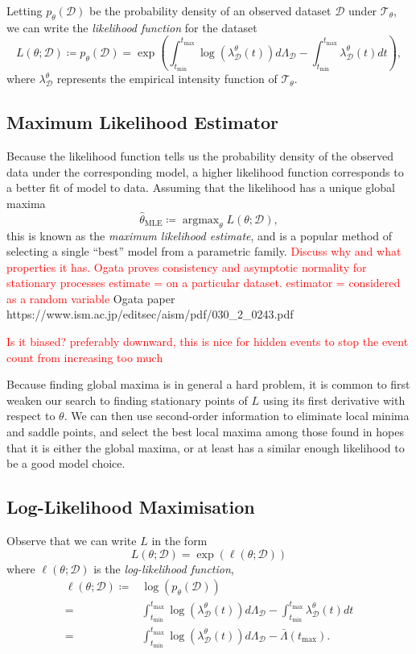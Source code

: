 \documentclass[honours,12pt]{unswthesis}
\DeclareMathOperator*{\argmax}{argmax}
\numberwithin{equation}{section}
\begin{document}
Letting $p_\theta(\mathcal{D})$ be the probability density of an observed dataset $\mathcal{D}$ under $\mathcal{T}_\theta$, we can write the \textit{likelihood function} for the dataset
$$L(\theta ; \mathcal{D}) \coloneq p_\theta(\mathcal{D}) = \exp\left(\int_{t_\mathrm{min}}^{t_\mathrm{max}}\log(\lambda_\mathcal{D}^\theta(t))d\Lambda_\mathcal{D}-\int_{t_\mathrm{min}}^{t_\mathrm{max}}\lambda_\mathcal{D}^\theta(t) dt\right),$$
where $\lambda_\mathcal{D}^\theta$ represents the empirical intensity function of $\mathcal{T}_\theta$.

\subsection{Maximum Likelihood Estimator}
Because the likelihood function tells us the probability density of the observed data under the corresponding model, a higher likelihood function corresponds to a better fit of model to data. Assuming that the likelihood has a unique global maxima
$$\hat\theta_\mathrm{MLE} \coloneq \argmax_\theta L(\theta;\mathcal{D}),$$
this is known as the \textit{maximum likelihood estimate}, and is a popular method of selecting a single ``best'' model from a parametric family.
\textcolor{red}{Discuss why and what properties it has. Ogata proves consistency and asymptotic normality for stationary processes}
\textcolor{red}{estimate = on a particular dataset. estimator = considered as a random variable}
Ogata paper https://www.ism.ac.jp/editsec/aism/pdf/030_2_0243.pdf 

\textcolor{red}{Is it biased? preferably downward, this is nice for hidden events to stop the event count from increasing too much}

Because finding global maxima is in general a hard problem, it is common to first weaken our search to finding stationary points of $L$ using its first derivative with respect to $\theta$. We can then use second-order information to eliminate local minima and saddle points, and select the best local maxima among those found in hopes that it is either the global maxima, or at least has a similar enough likelihood to be a good model choice.

\subsection{Log-Likelihood Maximisation}

Observe that we can write $L$ in the form
$$L(\theta;\mathcal{D}) = \exp(\ell(\theta;\mathcal{D}))$$
where $\ell(\theta;\mathcal{D})$ is the \textit{log-likelihood function},
\begin{equation*}
	\begin{align}
		\ell(\theta ; \mathcal{D})
		\coloneq &\log(p_\theta(\mathcal{D}))\\
		= & \int_{t_\mathrm{min}}^{t_\mathrm{max}}\log(\lambda_\mathcal{D}^\theta(t))d\Lambda_\mathcal{D}-\int_{t_\mathrm{min}}^{t_\mathrm{max}}\lambda_\mathcal{D}^\theta(t) dt \\
		= & \int_{t_\mathrm{min}}^{t_\mathrm{max}}\log(\lambda_\mathcal{D}^\theta(t))d\Lambda_\mathcal{D}-\bar\Lambda\left(t_\mathrm{max}\right).
	\end{align}
\end{equation*}
\end{document}
